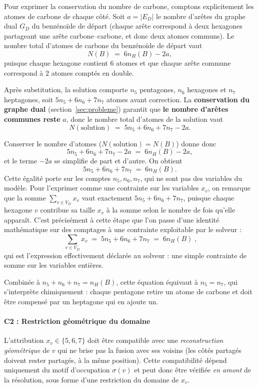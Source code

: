 \documentclass[11pt,a4paper]{article}
\newcommand{\GD}{\ensuremath{G_D}}                 %
\begin{document}
Pour exprimer la conservation du nombre de carbone, comptons explicitement les
atomes de carbone de chaque côté. Soit $a = |E_D|$ le nombre d'arêtes
du graphe dual $\GD$ du benzénoïde de départ (chaque arête correspond
à deux hexagones partageant une arête carbone--carbone, et donc deux
atomes communs). Le nombre total d'atomes de carbone du benzénoïde de
départ vaut
\[
  N(B) \;=\; 6 n_H(B) - 2 a ,
\]
puisque chaque hexagone contient $6$ atomes et que chaque arête
commune correspond à $2$ atomes comptés en double.

Après substitution, la solution comporte $n_5$ pentagones, $n_6$
hexagones et $n_7$ heptagones, soit $5 n_5 + 6 n_6 + 7 n_7$ atomes
avant correction. La \textbf{conservation du graphe dual}
(section~\ref{sec:probleme}) garantit que \textbf{le nombre d'arêtes
communes reste} $a$, donc le nombre total d'atomes de la solution vaut
\[
  N(\text{solution}) \;=\; 5 n_5 + 6 n_6 + 7 n_7 - 2 a .
\]

Conserver le nombre d'atomes ($N(\text{solution}) = N(B)$) donne donc
\[
  5 n_5 + 6 n_6 + 7 n_7 - 2 a \;=\; 6 n_H(B) - 2 a ,
\]
et le terme $-2a$ se simplifie de part et d'autre. On obtient
\[
  5 n_5 + 6 n_6 + 7 n_7 \;=\; 6 n_H(B) .
\]
Cette égalité porte sur les comptes $n_5, n_6, n_7$, qui ne sont pas
des variables du modèle. Pour l'exprimer comme une contrainte sur les
variables $x_v$, on remarque que la somme $\sum_{v \in V_D} x_v$ vaut
exactement $5 n_5 + 6 n_6 + 7 n_7$, puisque chaque hexagone $v$
contribue sa taille $x_v$ à la somme selon le nombre de fois qu'elle
apparaît. C'est précisément à cette étape que l'on passe d'une
identité mathématique sur des comptages à une contrainte exploitable
par le solveur :
\[
  \boxed{\; \sum_{v \in V_D} x_v \;=\; 5 n_5 + 6 n_6 + 7 n_7 \;=\; 6 n_H(B) \;,}
\]
qui est l'expression effectivement déclarée au solveur : une simple
contrainte de somme sur les variables entières.

Combinée à $n_5 + n_6 + n_7 = n_H(B)$, cette équation équivaut à
$n_5 = n_7$, qui s'interprète chimiquement : chaque pentagone retire
un atome de carbone et doit être compensé par un heptagone qui en
ajoute un.

\paragraph*{C2 : Restriction géométrique du domaine}
\label{sec:c2}

L'attribution $x_v \in \{5, 6, 7\}$ doit être compatible avec une
\emph{reconstruction géométrique} de $v$ qui ne brise pas la fusion
avec ses voisins (les côtés partagés doivent rester partagés, à la même
position). Cette compatibilité dépend uniquement du motif d'occupation
$\sigma(v)$ et peut donc être vérifiée \emph{en amont} de la résolution,
sous forme d'une restriction du domaine de $x_v$.
\end{document}
